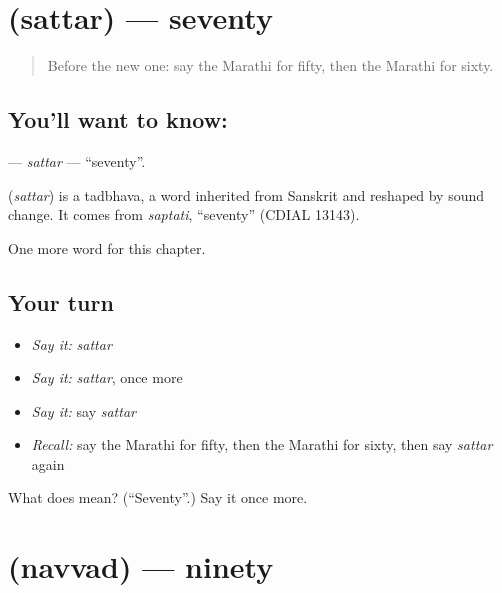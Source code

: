 \section[\texorpdfstring{\mr{सत्तर} (sattar)}{सत्तर (sattar)}]{ (sattar) — seventy}

\label{lesson:MR-C118-sattar}



\begin{quote}
Before the new one: say the Marathi for fifty, then the Marathi for sixty.
\end{quote}

\subsection*{You'll want to know: }
\textbf{} — \emph{sattar} — \textquotedblleft{}seventy\textquotedblright{}.

\begin{cousinweb}
\textbf{} (\emph{sattar}) is a tadbhava, a word inherited from Sanskrit and reshaped by sound change. It comes from \emph{saptati}, \textquotedblleft{}seventy\textquotedblright{} (CDIAL 13143).
\end{cousinweb}

\begin{grammarlens}[title={What you've built}]
One more word for this chapter.
\end{grammarlens}

\subsection*{Your turn}
\begin{itemize}
\raggedright
  \item \emph{Say it:} \emph{sattar}
  \item \emph{Say it:} \emph{sattar}, once more
  \item \emph{Say it:} say \emph{sattar}
  \item \emph{Recall:} say the Marathi for fifty, then the Marathi for sixty, then say \emph{sattar} again
\end{itemize}

\begin{tcolorbox}[breakable,colback=teal!4,colframe=teal!35!black,title={Before you move on}]
What does  mean? (\textquotedblleft{}Seventy\textquotedblright{}.) Say it once more.
\end{tcolorbox}
\section[\texorpdfstring{\mr{नव्वद} (navvad)}{नव्वद (navvad)}]{ (navvad) — ninety}

